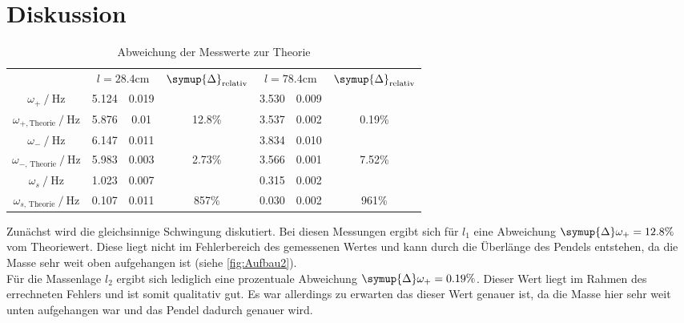 \section{Diskussion}
\label{sec:Diskussion}
\begin{table}
    \centering
    \caption{Abweichung der Messwerte zur Theorie}
    \begin{tabular}{c S @{${}\pm{}$} S c S[table-format=2.3] @{${}\pm{}$} S[table-format=1.3] c}
    \toprule
    &  &  &  & \\
    \cmidrule(lr){2-3}\cmidrule(lr){4-4}\cmidrule(lr){5-6}\cmidrule(lr){7-7}
    {$\omega_+ \mathbin{/} \unit{\hertz}$}                     & 5.124 & 0.019 &  & 3.530 & 0.009 & \\
    {$\omega_{+,\text{Theorie}} \mathbin{/} \unit{\hertz}$}    & 5.876 & 0.01 & 12.8\% & 3.537 & 0.002 & 0.19\% \\
    {$\omega_- \mathbin{/} \unit{\hertz}$}                     & 6.147 & 0.011 & & 3.834 & 0.010 & \\
    {$\omega_{{-}\text{, Theorie}} \mathbin{/} \unit{\hertz}$} & 5.983 & 0.003 & 2.73\% & 3.566 & 0.001 & 7.52\% \\
    {$\omega_s \mathbin{/} \unit{\hertz}$}                     & 1.023 & 0.007 & & 0.315 & 0.002 & \\
    {$\omega_{{s}\text{, Theorie}} \mathbin{/} \unit{\hertz}$} & 0.107 & 0.011 & 857\% & 0.030 & 0.002 & 961\% \\
    \bottomrule
    \end{tabular}
\end{table}


Zunächst wird die gleichsinnige Schwingung diskutiert. Bei diesen Messungen ergibt sich für $l_1$ eine Abweichung 
$\symup{\Delta}\omega_{+} = 12.8\%$ vom Theoriewert. Diese liegt nicht im Fehlerbereich des gemessenen Wertes und kann durch die Überlänge des Pendels entstehen, da die Masse sehr
weit oben aufgehangen ist (siehe \autoref{fig:Aufbau2}).\\ Für die Massenlage $l_2$ ergibt sich lediglich eine prozentuale Abweichung $\symup{\Delta}\omega_{+} = 0.19\%$. Dieser Wert
liegt im Rahmen des errechneten Fehlers und ist somit qualitativ gut. Es war allerdings zu erwarten das dieser Wert genauer ist, da die Masse hier sehr weit unten aufgehangen war
und das Pendel dadurch genauer wird. 


